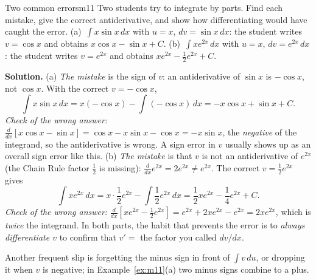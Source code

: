 \documentclass[11pt]{article}
\begin{document}
\begin{exmp}{Two common errors}{m11}
Two students try to integrate by parts. Find each mistake, give the correct antiderivative, and show how differentiating would have caught the error. (a)~$\int x\sin x\,dx$ with $u=x$, $dv=\sin x\,dx$: the student writes $v=\cos x$ and obtains $x\cos x-\sin x+C$. (b)~$\int xe^{2x}\,dx$ with $u=x$, $dv=e^{2x}\,dx$: the student writes $v=e^{2x}$ and obtains $xe^{2x}-\frac12e^{2x}+C$.

\textbf{Solution.} (a) \emph{The mistake} is the sign of $v$: an antiderivative of $\sin x$ is $-\cos x$, not $\cos x$. With the correct $v=-\cos x$,
\[\int x\sin x\,dx=x(-\cos x)-\int(-\cos x)\,dx=-x\cos x+\sin x+C .\]
\emph{Check of the wrong answer:} $\frac{d}{dx}\left[x\cos x-\sin x\right]=\cos x-x\sin x-\cos x=-x\sin x$, the \emph{negative} of the integrand, so the antiderivative is wrong. A sign error in $v$ usually shows up as an overall sign error like this.
(b) \emph{The mistake} is that $v$ is not an antiderivative of $e^{2x}$ (the Chain Rule factor $\frac12$ is missing): $\frac{d}{dx}e^{2x}=2e^{2x}\ne e^{2x}$. The correct $v=\frac12e^{2x}$ gives
\[\int xe^{2x}\,dx=x\cdot\frac12e^{2x}-\int\frac12e^{2x}\,dx=\frac12xe^{2x}-\frac14e^{2x}+C .\]
\emph{Check of the wrong answer:} $\frac{d}{dx}\left[xe^{2x}-\frac12e^{2x}\right]=e^{2x}+2xe^{2x}-e^{2x}=2xe^{2x}$, which is \emph{twice} the integrand. In both parts, the habit that prevents the error is to \emph{always differentiate $v$} to confirm that $v'=$ the factor you called $dv/dx$.
\end{exmp}

Another frequent slip is forgetting the minus sign in front of $\int v\,du$, or dropping it when $v$ is negative; in Example~\ref{ex:m11}(a) two minus signs combine to a plus.
\end{document}
